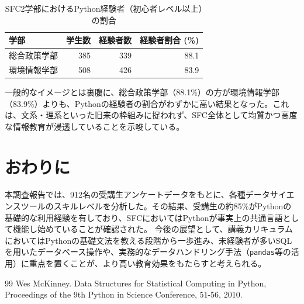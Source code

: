 \documentclass[uplatex, dvipdfmx, a4paper, 11pt]{jsarticle}
\begin{document}
\begin{table}[H]
    \centering
    \caption{SFC2学部におけるPython経験者（初心者レベル以上）の割合}
    \label{tab:faculty_python}
    \begin{tabular}{lrrr}
        \toprule
        学部     & 学生数 & 経験者数 & 経験者割合 (\%) \\
        \midrule
        総合政策学部 & 385 & 339  & 88.1       \\
        環境情報学部 & 508 & 426  & 83.9       \\
        \bottomrule
    \end{tabular}
\end{table}

一般的なイメージとは裏腹に、総合政策学部（88.1\%）の方が環境情報学部（83.9\%）よりも、Pythonの経験者の割合がわずかに高い結果となった。これは、文系・理系といった旧来の枠組みに捉われず、SFC全体として均質かつ高度な情報教育が浸透していることを示唆している。

\section{おわりに}
本調査報告では、912名の受講生アンケートデータをもとに、各種データサイエンスツールのスキルレベルを分析した。その結果、受講生の約85\%がPythonの基礎的な利用経験を有しており、SFCにおいてはPythonが事実上の共通言語として機能し始めていることが確認された。
今後の展望として、講義カリキュラムにおいてはPythonの基礎文法を教える段階から一歩進み、未経験者が多いSQLを用いたデータベース操作や、実務的なデータハンドリング手法（\texttt{pandas}等の活用）に重点を置くことが、より高い教育効果をもたらすと考えられる。

\begin{thebibliography}{99}
    Wes McKinney. Data Structures for Statistical Computing in Python, Proceedings of the 9th Python in Science Conference, 51-56, 2010.
\end{thebibliography}
\end{document}
